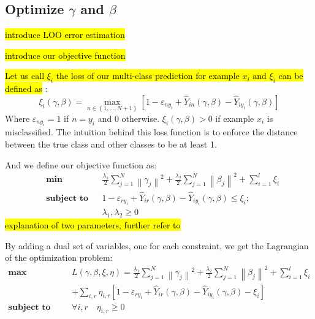 \subsection{Optimize $\gamma$ and $\beta$}
\hl{introduce LOO error estimation}

\hl{introduce our objective function}

\hl{Let us call $\xi_i$ the loss of our multi-class prediction for example $x_i$ and $\xi_i$ can be defined as} \cite{crammer2002algorithmic}:
\begin{equation}\label{eq:train_loss}
\xi_i(\gamma,\beta) = \mathop {\max }\limits_{n \in \left\lbrace 1,...,N+1 \right\rbrace } {\left[ {1 - {\varepsilon _{n{y_i}}} + {{\hat Y}_{in}}\left( {\gamma ,\beta } \right) - {{\hat Y}_{i{y_i}}}\left( {\gamma ,\beta } \right)} \right]}
\end{equation}
Where $\varepsilon _{n{y_i}}=1$ if $n=y_i$ and 0 otherwise. $\xi_i(\gamma,\beta)>0$ if example $x_i$ is misclassified. The intuition behind this loss function is to enforce the distance between the true class and other classes to be at least 1.

And we define our objective function as:
\begin{equation}\label{loss}
\begin{aligned}
& \textbf{min}
& & \frac{{{\lambda _1}}}{2}\sum\limits_{j = 1}^N {{{\left\| {{\gamma _j}} \right\|}^2}}  + \frac{{{\lambda _2}}}{2}\sum\limits_{j = 1}^N {{{\left\| {{\beta _j}} \right\|}^2}}  + \sum\limits_{i = 1}^l {{\xi _i}}   \\
& \textbf{subject to}
& & 1 - {\varepsilon _{r{y_i}}} + {\hat Y_{ir}}\left( {\gamma ,\beta } \right) - {\hat Y_{i{y_i}}}\left( {\gamma ,\beta } \right) \le {\xi_i};\\
& & &\lambda_1,\lambda_2 \ge 0
\end{aligned}
\end{equation}
\hl{explanation of two parameters, further refer to }\cite{crammer2002algorithmic}

By adding a dual set of variables, one for each constraint, we get the Lagrangian of the optimization problem:
\begin{equation}\label{eq:dual}
\begin{aligned}
 \textbf{max}\qquad {}& L\left( {\gamma ,\beta ,\xi ,\eta } \right) =\frac{{{\lambda _1}}}{2}\sum\limits_{j = 1}^N {{{\left\| {{\gamma _j}} \right\|}^2}}  + \frac{{{\lambda _2}}}{2}\sum\limits_{j = 1}^N {{{\left\| {{\beta _j}} \right\|}^2}}  + \sum\limits_{i = 1}^l {{\xi _i}} \\
   &+ \sum\limits_{i,r} {{\eta _{i,r}}\left[ {1 - {\varepsilon _{r{y_i}}} + {{\hat Y}_{ir}}\left( {\gamma ,\beta } \right) - {{\hat Y}_{i{y_i}}}\left( {\gamma ,\beta } \right) - {\xi _i}} \right]}  \\
 \textbf{subject to} \qquad {} & \forall i,r \quad {} {\eta _{i,r}} \ge 0
\end{aligned}
\end{equation}


